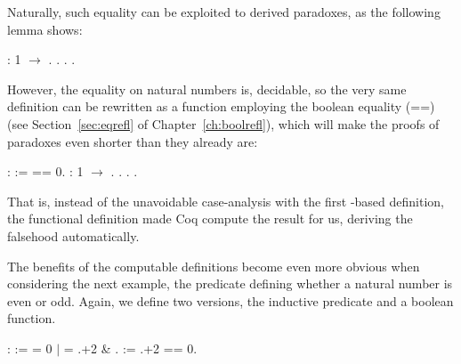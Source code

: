 Naturally, such equality can be exploited to derived paradoxes, as the
following lemma shows:


\begin{coqdoccode}
\coqdocemptyline
\coqdocnoindent
{} :  1 \ensuremath{\rightarrow} .\coqdoceol
\coqdocnoindent
{}.  . .\coqdoceol
\coqdocemptyline
\end{coqdoccode}


However, the equality on natural numbers is, decidable, so the very
same definition can be rewritten as a function employing the boolean
equality (==) (see Section~\ref{sec:eqrefl} of
Chapter~\ref{ch:boolrefl}), which will make the proofs of paradoxes
even shorter than they already are:


\begin{coqdoccode}
\coqdocemptyline
\coqdocnoindent
{}   :  :=  == 0.\coqdoceol
\coqdocemptyline
\coqdocnoindent
{} :  1 \ensuremath{\rightarrow} .\coqdoceol
\coqdocnoindent
{}. . .\coqdoceol
\coqdocemptyline
\end{coqdoccode}


That is, instead of the unavoidable case-analysis with the first
-based definition, the functional definition made Coq compute
the result for us, deriving the falsehood automatically.


The benefits of the computable definitions become even more obvious
when considering the next example, the predicate defining whether a
natural number is even or odd. Again, we define two versions, the
inductive predicate and a boolean function.




\begin{coqdoccode}
\coqdocemptyline
\coqdocnoindent
{}   :  :=\coqdoceol
\coqdocindent{1.00em}
   = 0 \ensuremath{|}     = .+2 \&  .\coqdoceol
\coqdocemptyline
\coqdocnoindent
{}   :=    .+2      == 0.\coqdoceol
\coqdocemptyline
\end{coqdoccode}


